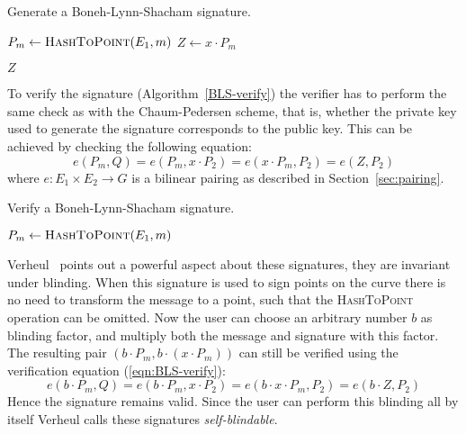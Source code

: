 \begin{algorithm}[t]
  \caption{Generate a Boneh-Lynn-Shacham signature.}
  \label{alg:BLS-sign}
  \addtolength{\baselineskip}{1mm}
  \begin{algorithmic}[1]
      \State $P_m \gets \Call{HashToPoint}{E_1, m}$
      \State $Z \gets x \cdot P_m$

      \Return $Z$
    \EndFunction
  \end{algorithmic}
\end{algorithm}

To verify the signature (Algorithm~\ref{BLS-verify}) the verifier has to perform
the same check as with the Chaum-Pedersen scheme, that is, whether the private
key used to generate the signature corresponds to the public key. This can be
achieved by checking the following equation:
\begin{equation}\label{eqn:BLS-verify}
  e(P_m, Q) = e(P_m, x \cdot P_2) = e(x \cdot P_m, P_2) = e(Z, P_2)
\end{equation}
where $e: E_1 \times E_2 \to G$ is a bilinear pairing as described in
Section~\ref{sec:pairing}.

\begin{algorithm}[t]
  \caption{Verify a Boneh-Lynn-Shacham signature.}
  \label{alg:BLS-verify}
  \addtolength{\baselineskip}{1mm}
  \begin{algorithmic}[1]
      \State $P_m \gets \Call{HashToPoint}{E_1, m}$
      \Return {}
      \EndIf

      \Return {}
    \EndFunction
  \end{algorithmic}
\end{algorithm}

Verheul~\cite{Verheul01} points out a powerful aspect about these signatures,
they are invariant under blinding. When this signature is used to sign points on
the curve there is no need to transform the message to a point, such that the
\textsc{HashToPoint} operation can be omitted. Now the user can choose an
arbitrary number $b$ as blinding factor, and multiply both the message and
signature with this factor. The resulting pair
$(b \cdot P_m, b \cdot (x \cdot P_m))$ can still be verified using the
verification equation (\ref{eqn:BLS-verify}):
$$e(b \cdot P_m, Q) = e(b \cdot P_m, x \cdot P_2) =
e(b \cdot x \cdot P_m, P_2) = e(b \cdot Z, P_2)$$
Hence the signature remains valid. Since the user can perform this blinding all
by itself Verheul calls these signatures \emph{self-blindable}.

